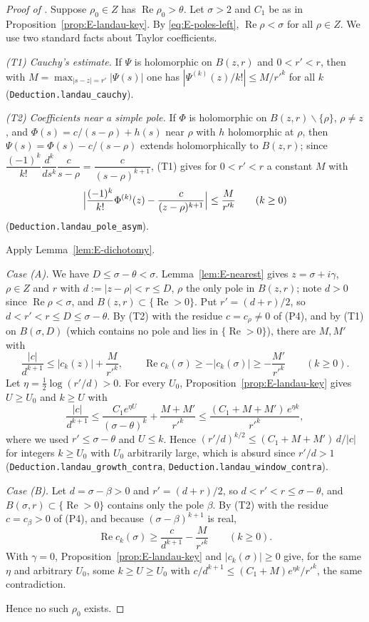 \begin{proof}[Proof of ]
Suppose $\rho_0\in Z$ has $\operatorname{Re}\rho_0>\theta$. Let $\sigma>2$ and $C_1$ be as in
Proposition~\ref{prop:E-landau-key}. By \eqref{eq:E-poles-left}, $\operatorname{Re}\rho<\sigma$
for all $\rho\in Z$. We use two standard facts about Taylor coefficients.

\emph{(T1) Cauchy's estimate.} If $\Psi$ is holomorphic on $B(z,r)$ and $0<r'<r$, then with
$M=\max_{|s-z|=r'}|\Psi(s)|$ one has $|\Psi^{(k)}(z)/k!|\le M/r'^{k}$ for all $k$
(\texttt{Deduction.landau\_cauchy}).

\emph{(T2) Coefficients near a simple pole.} If $\Phi$ is holomorphic on
$B(z,r)\smallsetminus\{\rho\}$, $\rho\neq z$, and $\Phi(s)=c/(s-\rho)+h(s)$ near $\rho$ with $h$
holomorphic at $\rho$, then $\Psi(s)=\Phi(s)-c/(s-\rho)$ extends holomorphically to $B(z,r)$;
since $\dfrac{(-1)^{k}}{k!}\dfrac{d^{k}}{ds^{k}}\dfrac{c}{s-\rho}=\dfrac{c}{(s-\rho)^{k+1}}$, (T1)
gives for $0<r'<r$ a constant $M$ with
\[
\Bigl|\frac{(-1)^{k}}{k!}\Phi^{(k)}(z)-\frac{c}{(z-\rho)^{k+1}}\Bigr|\le\frac{M}{r'^{k}}\qquad(k\ge0)
\]
(\texttt{Deduction.landau\_pole\_asym}).

Apply Lemma~\ref{lem:E-dichotomy}.

\emph{Case (A).} We have $D\le\sigma-\theta<\sigma$. Lemma~\ref{lem:E-nearest} gives
$z=\sigma+i\gamma$, $\rho\in Z$ and $r$ with $d:=|z-\rho|<r\le D$, $\rho$ the only pole in
$B(z,r)$; note $d>0$ since $\operatorname{Re}\rho<\sigma$, and $B(z,r)\subset\{\operatorname{Re}>0\}$.
Put $r'=(d+r)/2$, so $d<r'<r\le D\le\sigma-\theta$. By (T2) with the residue $c=c_\rho\neq0$ of
(P4), and by (T1) on $B(\sigma,D)$ (which contains no pole and lies in
$\{\operatorname{Re}>0\}$), there are $M,M'$ with
\[
\frac{|c|}{d^{k+1}}\le|c_k(z)|+\frac{M}{r'^{k}},\qquad
\operatorname{Re}c_k(\sigma)\ge-|c_k(\sigma)|\ge-\frac{M'}{r'^{k}}\qquad(k\ge0).
\]
Let $\eta=\tfrac12\log(r'/d)>0$. For every $U_0$, Proposition~\ref{prop:E-landau-key} gives
$U\ge U_0$ and $k\ge U$ with
\[
\frac{|c|}{d^{k+1}}\le\frac{C_1e^{\eta U}}{(\sigma-\theta)^{k}}+\frac{M+M'}{r'^{k}}\le
\frac{(C_1+M+M')\,e^{\eta k}}{r'^{k}},
\]
where we used $r'\le\sigma-\theta$ and $U\le k$. Hence
$(r'/d)^{k/2}\le(C_1+M+M')\,d/|c|$ for integers $k\ge U_0$ with $U_0$ arbitrarily large, which is
absurd since $r'/d>1$ (\texttt{Deduction.landau\_growth\_contra},
\texttt{Deduction.landau\_window\_contra}).

\emph{Case (B).} Let $d=\sigma-\beta>0$ and $r'=(d+r)/2$, so $d<r'<r\le\sigma-\theta$, and
$B(\sigma,r)\subset\{\operatorname{Re}>0\}$ contains only the pole $\beta$. By (T2) with the residue
$c=c_\beta>0$ of (P4), and because $(\sigma-\beta)^{k+1}$ is real,
\[
\operatorname{Re}c_k(\sigma)\ge\frac{c}{d^{k+1}}-\frac{M}{r'^{k}}\qquad(k\ge0).
\]
With $\gamma=0$, Proposition~\ref{prop:E-landau-key} and $|c_k(\sigma)|\ge0$ give, for the same
$\eta$ and arbitrary $U_0$, some $k\ge U\ge U_0$ with
$c/d^{k+1}\le(C_1+M)e^{\eta k}/r'^{k}$, the same contradiction.

Hence no such $\rho_0$ exists.

\end{proof}
